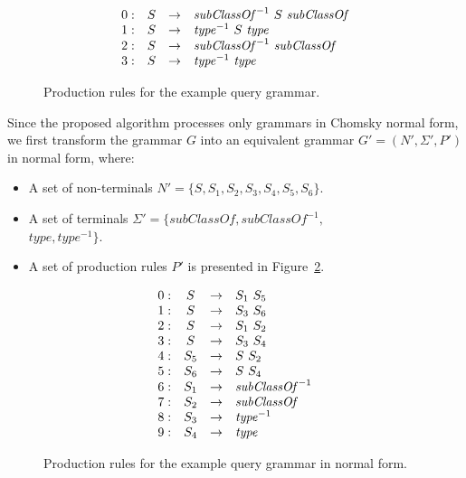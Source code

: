 \begin{figure}[h]
   \[
\begin{array}{rccl}
   0: & S & \rightarrow & \text{\textit{subClassOf}}^{-1} \ S \ \text{\textit{subClassOf}} \\ 
   1: & S & \rightarrow & \text{\textit{type}}^{-1} \ S \ \text{\textit{type}} \\ 
   2: & S & \rightarrow & \text{\textit{subClassOf}}^{-1} \ \text{\textit{subClassOf}} \\ 
   3: & S & \rightarrow & \text{\textit{type}}^{-1} \ \text{\textit{type}} \\ 
\end{array}
\]
\caption{Production rules for the example query grammar.}
\label{ProductionRulesExampleQuery}
\end{figure}

Since the proposed algorithm processes only grammars in Chomsky normal form, we first transform the grammar $G$ into an equivalent grammar $G' = (N', \Sigma', P')$ in normal form, where:
\begin{itemize}
    \item A set of non-terminals $N' = \{S, S_1, S_2, S_3, S_4, S_5, S_6\}$.
    \item A set of terminals $\Sigma' = \{subClassOf, subClassOf^{-1},$ \\ $type, type^{-1}\}$.
    \item A set of production rules $P'$ is presented in Figure~\ref{ProductionRulesExampleQueryCNF}.
\end{itemize}

\begin{figure}[h]
   \[
\begin{array}{rccl}
   0: & S & \rightarrow & S_1 \ S_5 \\
   1: & S & \rightarrow & S_3 \ S_6 \\
   2: & S & \rightarrow & S_1 \ S_2 \\
   3: & S & \rightarrow & S_3 \ S_4 \\
   4: & S_5 & \rightarrow & S \ S_2 \\
   5: & S_6 & \rightarrow & S \ S_4 \\
   6: & S_1 & \rightarrow & \text{\textit{subClassOf}}^{-1} \\ 
   7: & S_2 & \rightarrow & \text{\textit{subClassOf}} \\ 
   8: & S_3 & \rightarrow & \text{\textit{type}}^{-1} \\
   9: & S_4 & \rightarrow & \text{\textit{type}} \\ 
\end{array}
\]
\caption{Production rules for the example query grammar in normal form.}
\label{ProductionRulesExampleQueryCNF}
\end{figure}

